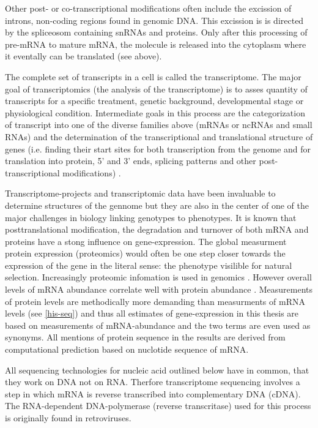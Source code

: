 Other post- or co-transcriptional modifications often include the
excission of introns, non-coding regions found in genomic DNA. This
excission is is directed by the spliceosom containing snRNAs and
proteins. Only after this processing of pre-mRNA to mature mRNA, the
molecule is released into the cytoplasm where it eventally can be
translated (see above).

The complete set of transcripts in a cell is called the
transcriptome. The major goal of transcriptomics (the analysis of the
transcriptome) is to asses quantity of transcripts for a specific
treatment, genetic background, developmental stage or physiological
condition. Intermediate goals in this process are the categorization
of transcript into one of the diverse families above (mRNAs or ncRNAs
and small RNAs) and the determination of the transcriptional and
translational structure of genes (i.e. finding their start sites for
both transcription from the genome and for translation into protein,
5' and 3' ends, splicing patterns and other post-transcriptional
modifications) \cite{pmid19015660}.

Transcriptome-projects and transcriptomic data have been invaluable to
determine structures of the gennome but they are also in the center of
one of the major challenges in biology linking genotypes to
phenotypes. It is known that posttranslational modification, the
degradation and turnover of both mRNA and proteins have a stong
influence on gene-expression. The global measurment protein expression
(proteomics) would often be one step closer towards the expression of
the gene in the literal sense: the phenotype visilible for natural
selection. Increasingly proteomic infomation is used in genomics
\cite{pmid20121477}. However overall levels of mRNA abundance
correlate well with protein abundance
\cite{pmid21593866}. Measurements of protein levels are methodically
more demanding than measurments of mRNA levels (see \ref{his-seq}) and
thus all estimates of gene-expression in this thesis are based on
measurements of mRNA-abundance and the two terms are even used as
synonyms. All mentions of protein sequence in the results are derived
from computational prediction based on nuclotide sequence of mRNA.

All sequencing technologies for nucleic acid outlined below have in
common, that they work on DNA not on RNA. Therfore transcriptome
sequencing involves a step in which mRNA is reverse transcribed into
complementary DNA (cDNA). The RNA-dependent DNA-polymerase (reverse
transcritase) used for this process is originally found in
retroviruses.


